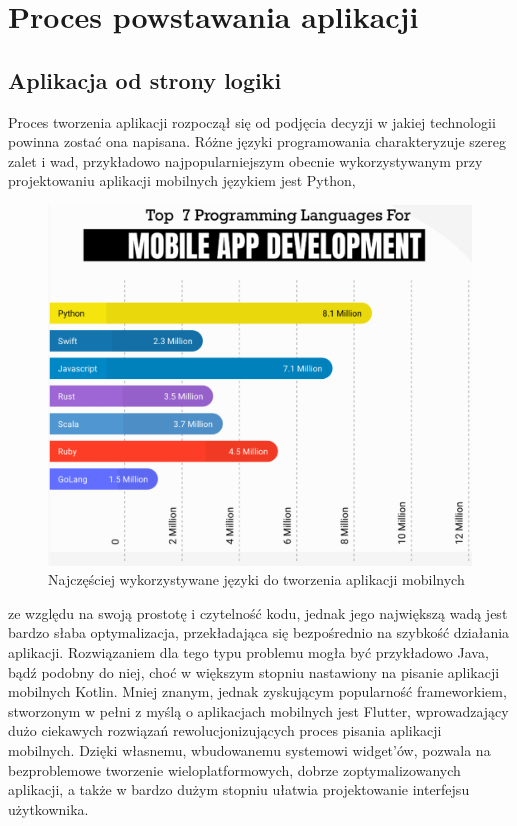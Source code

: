 \documentclass[12pt, a4paper]{article}
\begin{document}
\begin{sloppypar}
\section{Proces powstawania aplikacji}
{
  \subsection{Aplikacja od strony logiki}{
  Proces tworzenia aplikacji rozpoczął się od podjęcia decyzji w jakiej technologii powinna
  zostać ona napisana. Różne języki programowania charakteryzuje szereg zalet i wad, przykładowo
  najpopularniejszym obecnie wykorzystywanym przy projektowaniu aplikacji mobilnych
  językiem jest Python,
  \begin{figure}[H]
    \centering
    \includegraphics[width=.9\textwidth]{top-lang-info.PNG}
    \caption{Najczęściej wykorzystywane języki do tworzenia aplikacji mobilnych}
    \label{fig:lang}
  \end{figure} 
  ze względu na swoją prostotę i czytelność kodu, jednak jego największą wadą jest bardzo
  słaba optymalizacja, przekładająca się bezpośrednio na szybkość działania aplikacji.
  Rozwiązaniem dla tego typu problemu mogła być przykładowo Java, bądź podobny do niej,
  choć w większym stopniu nastawiony na pisanie aplikacji mobilnych Kotlin. Mniej znanym,
  jednak zyskującym popularność frameworkiem, stworzonym w pełni z myślą o aplikacjach mobilnych
  jest Flutter, wprowadzający dużo ciekawych rozwiązań rewolucjonizujących proces pisania
  aplikacji mobilnych. Dzięki własnemu, wbudowanemu systemowi widget'ów, pozwala na
  bezproblemowe tworzenie wieloplatformowych, dobrze zoptymalizowanych aplikacji, a także
  w bardzo dużym stopniu ułatwia projektowanie interfejsu użytkownika.

}}
\end{sloppypar}
\end{document}
